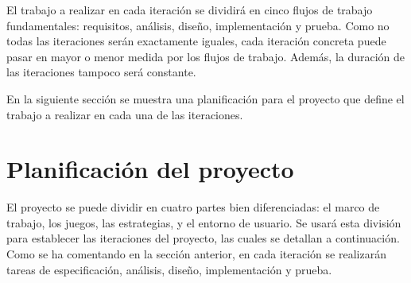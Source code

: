 \documentclass[a4paper,12pt]{article}
\begin{document}
\par 
El trabajo a realizar en cada iteración se dividirá en cinco flujos de trabajo fundamentales: requisitos, análisis, diseño, implementación y prueba.
Como no todas las iteraciones serán exactamente iguales, cada iteración concreta puede pasar en mayor o menor medida por los flujos de trabajo. 
Además, la duración de las iteraciones tampoco será constante.

\par 
En la siguiente sección se muestra una planificación para el proyecto que define el trabajo a realizar en cada una de las iteraciones.


\section{Planificación del proyecto}
\par 
El proyecto se puede dividir en cuatro partes bien diferenciadas: el marco de trabajo, los juegos, las estrategias, y el entorno de usuario.
Se usará esta división para establecer las iteraciones del proyecto, las cuales se detallan a continuación.
Como se ha comentando en la sección anterior, en cada iteración se realizarán tareas de especificación, análisis, diseño, implementación y prueba.
\end{document}
